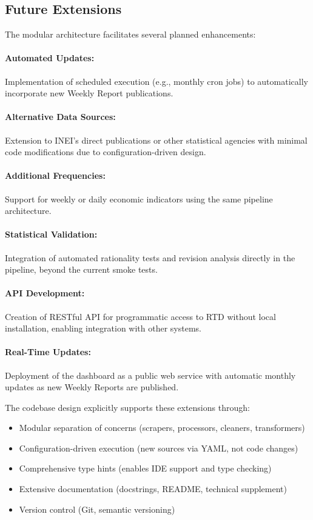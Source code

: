 \documentclass[a4paper, fleqn, 11pt]{article}
\begin{document}
\subsection{Future Extensions}

The modular architecture facilitates several planned enhancements:

\paragraph{Automated Updates:} Implementation of scheduled execution (e.g., monthly cron jobs) to automatically incorporate new Weekly Report publications.

\paragraph{Alternative Data Sources:} Extension to INEI's direct publications or other statistical agencies with minimal code modifications due to configuration-driven design.

\paragraph{Additional Frequencies:} Support for weekly or daily economic indicators using the same pipeline architecture.

\paragraph{Statistical Validation:} Integration of automated rationality tests and revision analysis directly in the pipeline, beyond the current smoke tests.

\paragraph{API Development:} Creation of RESTful API for programmatic access to RTD without local installation, enabling integration with other systems.

\paragraph{Real-Time Updates:} Deployment of the dashboard as a public web service with automatic monthly updates as new Weekly Reports are published.

The codebase design explicitly supports these extensions through:
\begin{itemize}
    \item Modular separation of concerns (scrapers, processors, cleaners, transformers)
    \item Configuration-driven execution (new sources via YAML, not code changes)
    \item Comprehensive type hints (enables IDE support and type checking)
    \item Extensive documentation (docstrings, README, technical supplement)
    \item Version control (Git, semantic versioning)
\end{itemize}
\end{document}
